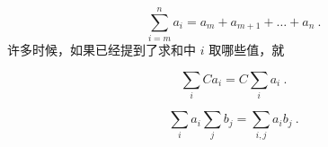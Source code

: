 
\begin{issues}
\issueDraft
\end{issues}

\begin{equation}
\sum_{i=m}^n a_i = a_m + a_{m+1} + \dots + a_n~.
\end{equation}
许多时候，如果已经提到了求和中 $i$ 取哪些值，就

\begin{equation}
\sum_i C a_i = C\sum_i a_i~.
\end{equation}

\begin{equation}
\sum_i a_i \sum_j b_j = \sum_{i,j} a_i b_j~.
\end{equation}
